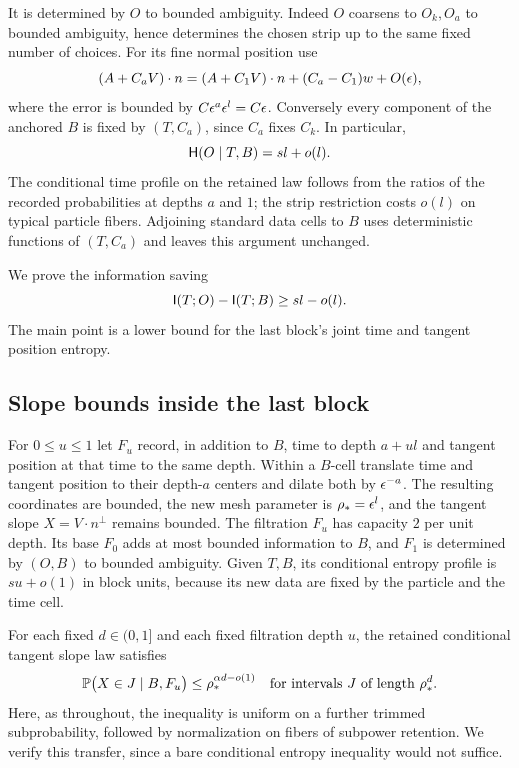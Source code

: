 It is determined by $O$ to bounded ambiguity. Indeed $O$ coarsens to $O_k,O_a$
to bounded ambiguity, hence determines the chosen strip up to the same fixed
number of choices. For its fine normal position use
\begin{equation}
 (A+C_aV)\cdot n=(A+C_1V)\cdot n+(C_a-C_1)w+O(\epsilon),
 \label{eq:isotropic-normal-transport}
\end{equation}
where the error is bounded by
$C\epsilon^a\epsilon^l=C\epsilon$. Conversely every component of the anchored $B$ is
fixed by $(T,C_a)$, since $C_a$ fixes $C_k$. In particular,
\begin{equation}
 \mathsf H(O\mid T,B)=sl+o(l).
 \label{eq:isotropic-last-time}
\end{equation}
The conditional time profile on the retained law follows from the ratios of
the recorded probabilities at depths $a$ and $1$; the strip restriction costs
$o(l)$ on typical particle fibers. Adjoining standard data cells to $B$
uses deterministic functions of $(T,C_a)$ and leaves this argument unchanged.

We prove the information saving
\begin{equation}
 \mathsf I(T;O)-\mathsf I(T;B)\geq sl-o(l).
 \label{eq:isotropic-information-saving}
\end{equation}
The main point is a lower bound for the last block's joint time and tangent
position entropy.

\subsection{Slope bounds inside the last block}

For $0\leq u\leq1$ let $F_u$ record, in addition to $B$, time to depth
$a+ul$ and tangent position at that time to the same depth. Within a $B$-cell
translate time and tangent position to their depth-$a$ centers and dilate
both by $\epsilon^{-a}$. The resulting coordinates are bounded, the new mesh
parameter is $\rho_*=\epsilon^l$, and the tangent slope
$X=V\cdot n^\perp$ remains bounded. The filtration $F_u$ has capacity $2$
per unit depth. Its base $F_0$ adds at most bounded information to $B$, and
$F_1$ is determined by $(O,B)$ to bounded ambiguity. Given $T,B$, its
conditional entropy profile is $su+o(1)$ in block units, because its new data
are fixed by the particle and the time cell.

For each fixed $d\in(0,1]$ and each fixed filtration depth $u$, the retained
conditional tangent slope law satisfies
\begin{equation}
 \mathbb P\bigl(X\in J\mid B,F_u\bigr)
 \leq \rho_*^{\alpha d-o(1)}
 \quad\text{for intervals }J\text{ of length }\rho_*^d.
 \label{eq:isotropic-inherited-tangent}
\end{equation}
Here, as throughout, the inequality is uniform on a further trimmed
subprobability, followed by normalization on fibers of subpower retention.
We verify this transfer, since a bare conditional entropy inequality would
not suffice.

